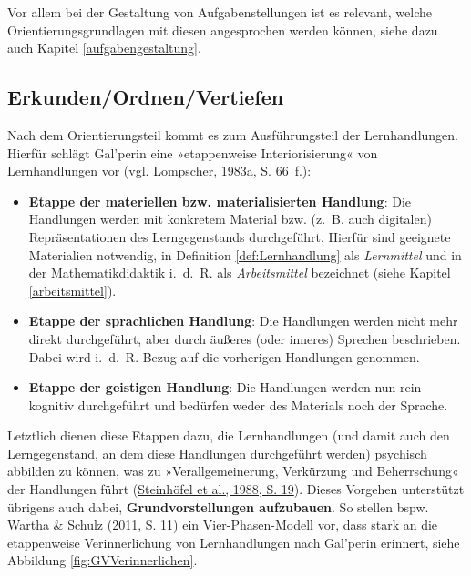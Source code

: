 \documentclass[
]{scrbook}
\theoremstyle{definition}
\theoremstyle{definition}
\theoremstyle{definition}
\theoremstyle{definition}
\theoremstyle{remark}
\begin{document}
Vor allem bei der Gestaltung von Aufgabenstellungen ist es relevant, welche Orientierungsgrundlagen mit diesen angesprochen werden können, siehe dazu auch Kapitel \ref{aufgabengestaltung}.

\hypertarget{erkunden-ordnen-vertiefen}{%
\subsection{Erkunden/Ordnen/Vertiefen}\label{erkunden-ordnen-vertiefen}}

Nach dem Orientierungsteil kommt es zum Ausführungsteil der Lernhandlungen. Hierfür schlägt Gal'perin eine »etappenweise Interiorisierung« von Lernhandlungen vor (vgl. \protect\hyperlink{ref-Lompscher1983a}{Lompscher, 1983a, S. 66~f.}):

\begin{itemize}
\item
  \textbf{Etappe der materiellen bzw. materialisierten Handlung}: Die Handlungen werden mit konkretem Material bzw. (z.~B. auch digitalen) Repräsentationen des Lerngegenstands durchgeführt. Hierfür sind geeignete Materialien notwendig, in Definition \ref{def:Lernhandlung} als \emph{Lernmittel} und in der Mathematikdidaktik i.~d.~R. als \emph{Arbeitsmittel} bezeichnet (siehe Kapitel \ref{arbeitsmittel}).
\item
  \textbf{Etappe der sprachlichen Handlung}: Die Handlungen werden nicht mehr direkt durchgeführt, aber durch äußeres (oder inneres) Sprechen beschrieben. Dabei wird i.~d.~R. Bezug auf die vorherigen Handlungen genommen.
\item
  \textbf{Etappe der geistigen Handlung}: Die Handlungen werden nun rein kognitiv durchgeführt und bedürfen weder des Materials noch der Sprache.
\end{itemize}

Letztlich dienen diese Etappen dazu, die Lernhandlungen (und damit auch den Lerngegenstand, an dem diese Handlungen durchgeführt werden) psychisch abbilden zu können, was zu »Verallgemeinerung, Verkürzung und Beherrschung« der Handlungen führt (\protect\hyperlink{ref-Steinhofel1988}{Steinhöfel et al., 1988, S. 19}). Dieses Vorgehen unterstützt übrigens auch dabei, \textbf{Grundvorstellungen aufzubauen}. So stellen bspw. Wartha \& Schulz (\protect\hyperlink{ref-Wartha2011}{2011, S. 11}) ein Vier-Phasen-Modell vor, dass stark an die etappenweise Verinnerlichung von Lernhandlungen nach Gal'perin erinnert, siehe Abbildung \ref{fig:GVVerinnerlichen}.
\end{document}
